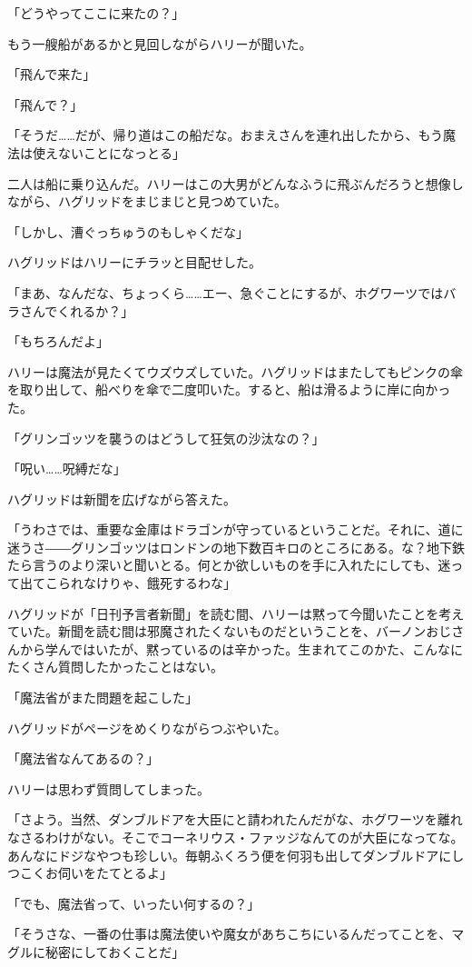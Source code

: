 \documentclass[10pt,a4paper]{article}
\begin{document}
\begin{CJK}{UTF8}{min}
「どうやってここに来たの？」

もう一艘船があるかと見回しながらハリーが聞いた。

「飛んで来た」

「飛んで？」

「そうだ……だが、帰り道はこの船だな。おまえさんを連れ出したから、もう魔法は使えないことになっとる」

二人は船に乗り込んだ。ハリーはこの大男がどんなふうに飛ぶんだろうと想像しながら、ハグリッドをまじまじと見つめていた。

「しかし、漕ぐっちゅうのもしゃくだな」

ハグリッドはハリーにチラッと目配せした。

「まあ、なんだな、ちょっくら……エー、急ぐことにするが、ホグワーツではバラさんでくれるか？」

「もちろんだよ」

ハリーは魔法が見たくてウズウズしていた。ハグリッドはまたしてもピンクの傘を取り出して、船べりを傘で二度叩いた。すると、船は滑るように岸に向かった。

「グリンゴッツを襲うのはどうして狂気の沙汰なの？」

「呪い……呪縛だな」

ハグリッドは新聞を広げながら答えた。

「うわさでは、重要な金庫はドラゴンが守っているということだ。それに、道に迷うさ――グリンゴッツはロンドンの地下数百キロのところにある。な？地下鉄たら言うのより深いと聞いとる。何とか欲しいものを手に入れたにしても、迷って出てこられなけりゃ、餓死するわな」

ハグリッドが「日刊予言者新聞」を読む間、ハリーは黙って今聞いたことを考えていた。新聞を読む間は邪魔されたくないものだということを、バーノンおじさんから学んではいたが、黙っているのは辛かった。生まれてこのかた、こんなにたくさん質問したかったことはない。

「魔法省がまた問題を起こした」

ハグリッドがページをめくりながらつぶやいた。

「魔法省なんてあるの？」

ハリーは思わず質問してしまった。

「さよう。当然、ダンブルドアを大臣にと請われたんだがな、ホグワーツを離れなさるわけがない。そこでコーネリウス・ファッジなんてのが大臣になってな。あんなにドジなやつも珍しい。毎朝ふくろう便を何羽も出してダンブルドアにしつこくお伺いをたてとるよ」

「でも、魔法省って、いったい何するの？」

「そうさな、一番の仕事は魔法使いや魔女があちこちにいるんだってことを、マグルに秘密にしておくことだ」


\end{CJK}
\end{document}
